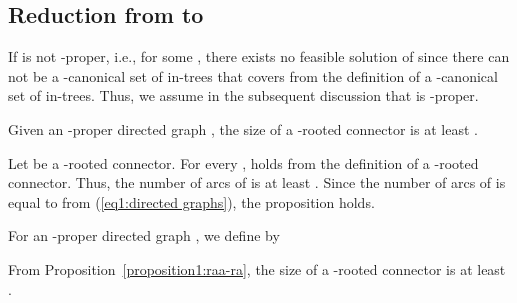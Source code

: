 \documentclass[11pt]{article}
\newcounter{ni}
\theoremstyle{plain}
\newcommand{\eop}{\hfill \usebox{\ProofSym}}
\newenvironment{proof}{\noindent {\it Proof.}}{\eop\par\vspace{0.3cm}}
\begin{document}
\subsection{Reduction from  to }
\label{Reduction from CDGI to RAA-RA}

If  is not -proper, i.e., 
 for some ,  
there exists no feasible solution of  
since there can not be a -canonical set of in-trees 
that covers  
from the definition of a -canonical set of in-trees.  
Thus, we assume in the subsequent discussion that  is -proper. 

\begin{proposition} \label{proposition1:raa-ra}
Given an -proper directed graph , 
the size of a -rooted connector is at least 
\sum.
\end{proposition}
\begin{proof}
Let  be a -rooted connector. 
For every ,  holds 
from the definition of a -rooted connector.
Thus, the number of arcs of  is at least . 
Since the number of arcs of  is equal to 
 from (\ref{eq1:directed graphs}), the proposition holds. 
\end{proof}
For an -proper directed graph , we define  by 

From Proposition~\ref{proposition1:raa-ra}, the size of a -rooted 
connector is at least . 
\end{document}
